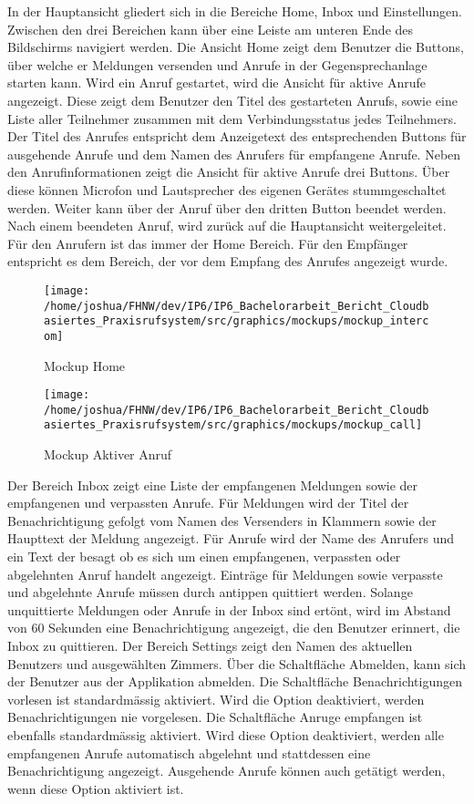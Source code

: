 In der Hauptansicht gliedert sich in die Bereiche Home, Inbox und Einstellungen.
Zwischen den drei Bereichen kann über eine Leiste am unteren Ende des Bildschirms navigiert werden.
Die Ansicht Home zeigt dem Benutzer die Buttons, über welche er Meldungen versenden und Anrufe in der Gegensprechanlage starten kann.
Wird ein Anruf gestartet, wird die Ansicht für aktive Anrufe angezeigt.
Diese zeigt dem Benutzer den Titel des gestarteten Anrufs, sowie eine Liste aller Teilnehmer zusammen mit dem Verbindungsstatus jedes Teilnehmers.
Der Titel des Anrufes entspricht dem Anzeigetext des entsprechenden Buttons für ausgehende Anrufe und dem Namen des Anrufers für empfangene Anrufe.
Neben den Anrufinformationen zeigt die Ansicht für aktive Anrufe drei Buttons.
Über diese können Microfon und Lautsprecher des eigenen Gerätes stummgeschaltet werden.
Weiter kann über der Anruf über den dritten Button beendet werden.
Nach einem beendeten Anruf, wird zurück auf die Hauptansicht weitergeleitet.
Für den Anrufern ist das immer der Home Bereich.
Für den Empfänger entspricht es dem Bereich, der vor dem Empfang des Anrufes angezeigt wurde.

\begin{figure}[h]
    \centering
    \begin{minipage}[b]{0.4\textwidth}
        \texttt{[image: /home/joshua/FHNW/dev/IP6/IP6\_Bachelorarbeit\_Bericht\_Cloudbasiertes\_Praxisrufsystem/src/graphics/mockups/mockup\_intercom]}
        \caption{Mockup Home}
    \end{minipage}
    \hfill
    \begin{minipage}[b]{0.4\textwidth}
        \texttt{[image: /home/joshua/FHNW/dev/IP6/IP6\_Bachelorarbeit\_Bericht\_Cloudbasiertes\_Praxisrufsystem/src/graphics/mockups/mockup\_call]}
        \caption{Mockup Aktiver Anruf}
    \end{minipage}\label{fig:Mockups-Home-ActiveCall}
\end{figure}

Der Bereich Inbox zeigt eine Liste der empfangenen Meldungen sowie der empfangenen und verpassten Anrufe.
Für Meldungen wird der Titel der Benachrichtigung gefolgt vom Namen des Versenders in Klammern sowie der Haupttext der Meldung angezeigt.
Für Anrufe wird der Name des Anrufers und ein Text der besagt ob es sich um einen empfangenen, verpassten oder abgelehnten Anruf handelt angezeigt.
Einträge für Meldungen sowie verpasste und abgelehnte Anrufe müssen durch antippen quittiert werden.
Solange unquittierte Meldungen oder Anrufe in der Inbox sind ertönt, wird im Abstand von 60 Sekunden eine Benachrichtigung angezeigt, die den Benutzer erinnert, die Inbox zu quittieren.
Der Bereich Settings zeigt den Namen des aktuellen Benutzers und ausgewählten Zimmers.
Über die Schaltfläche Abmelden, kann sich der Benutzer aus der Applikation abmelden.
Die Schaltfläche Benachrichtigungen vorlesen ist standardmässig aktiviert.
Wird die Option deaktiviert, werden Benachrichtigungen nie vorgelesen.
Die Schaltfläche Anruge empfangen ist ebenfalls standardmässig aktiviert.
Wird diese Option deaktiviert, werden alle empfangenen Anrufe automatisch abgelehnt und stattdessen eine Benachrichtigung angezeigt.
Ausgehende Anrufe können auch getätigt werden, wenn diese Option aktiviert ist.


